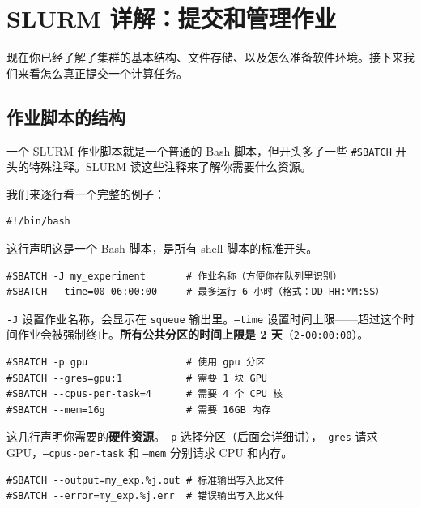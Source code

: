 \section{SLURM 详解：提交和管理作业}

现在你已经了解了集群的基本结构、文件存储、以及怎么准备软件环境。接下来我们来看怎么真正提交一个计算任务。

\subsection{作业脚本的结构}

一个 SLURM 作业脚本就是一个普通的 Bash 脚本，但开头多了一些 \texttt{\#SBATCH} 开头的特殊注释。SLURM 读这些注释来了解你需要什么资源。

我们来逐行看一个完整的例子：

\begin{lstlisting}[language=slurm]
#!/bin/bash
\end{lstlisting}

这行声明这是一个 Bash 脚本，是所有 shell 脚本的标准开头。

\begin{lstlisting}[language=slurm]
#SBATCH -J my_experiment       # 作业名称（方便你在队列里识别）
#SBATCH --time=00-06:00:00     # 最多运行 6 小时（格式：DD-HH:MM:SS）
\end{lstlisting}

\texttt{-J} 设置作业名称，会显示在 \texttt{squeue} 输出里。\texttt{--time} 设置时间上限——超过这个时间作业会被强制终止。\textbf{所有公共分区的时间上限是 2 天}（\texttt{2-00:00:00}）。

\begin{lstlisting}[language=slurm]
#SBATCH -p gpu                 # 使用 gpu 分区
#SBATCH --gres=gpu:1           # 需要 1 块 GPU
#SBATCH --cpus-per-task=4      # 需要 4 个 CPU 核
#SBATCH --mem=16g              # 需要 16GB 内存
\end{lstlisting}

这几行声明你需要的\textbf{硬件资源}。\texttt{-p} 选择分区（后面会详细讲），\texttt{--gres} 请求 GPU，\texttt{--cpus-per-task} 和 \texttt{--mem} 分别请求 CPU 和内存。

\begin{lstlisting}[language=slurm]
#SBATCH --output=my_exp.%j.out # 标准输出写入此文件
#SBATCH --error=my_exp.%j.err  # 错误输出写入此文件
\end{lstlisting}

